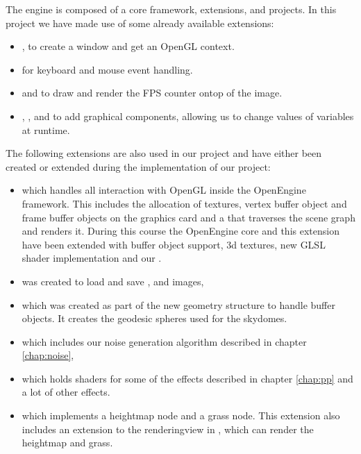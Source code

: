 The engine is composed of a core framework, extensions, and
projects. In this project we have made use of some already available
extensions:

\begin{itemize}
  \item {}, to create a window and get an OpenGL context.
  \item {} for keyboard and mouse event handling.
  \item {} and  to draw and render the FPS
    counter ontop of the image.
  \item {}, , and
     to add graphical components, allowing us to
    change values of variables at runtime.
\end{itemize}

The following extensions are also used in our project and have either
been created or extended during the implementation of our project:

\begin{itemize}
  \item {} which handles all interaction with
    OpenGL inside the OpenEngine framework. This includes the
    allocation of textures, vertex buffer object and frame buffer
    objects on the graphics card and a  that
    traverses the scene graph and renders it. During this course the
    OpenEngine core and this extension have been extended with buffer
    object support, 3d textures, new GLSL shader implementation and
    our .
  \item {} was created to load and save ,
     and  images,
  \item {} which was created as part of the new geometry
    structure to handle  buffer objects. It creates the geodesic
    spheres used for the skydomes.
  \item {} which includes our noise generation algorithm
    described in chapter \ref{chap:noise},
  \item {} which holds shaders for
    some of the effects described in chapter \ref{chap:pp} and a lot
    of other effects.
  \item {} which implements a heightmap node and a grass
    node. This extension also includes an extension to the
    renderingview in , which can render the
    heightmap and grass.
\end{itemize}

